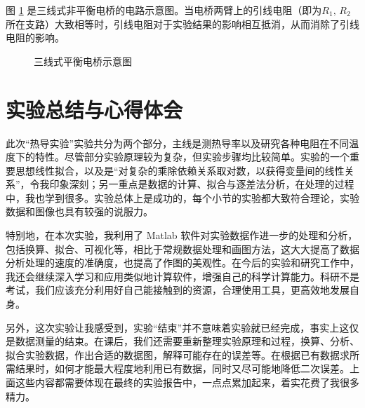 \documentclass[UTF8]{article}
\theoremstyle{MyLineTheoremStyle} %
\theoremstyle{MyBlockTheoremStyle} %
\theoremstyle{MySubsubsectionStyle} %
\begin{document}
图 \ref{三线式平衡电桥示意图} 是三线式非平衡电桥的电路示意图。当电桥两臂上的引线电阻（即为$ R_1,\,R_2 $所在支路）大致相等时，引线电阻对于实验结果的影响相互抵消，从而消除了引线电阻的影响。
\begin{figure}[H]
    \centering
    \caption{三线式平衡电桥示意图}
    \label{三线式平衡电桥示意图}
\end{figure}



\section{实验总结与心得体会}
此次“热导实验”实验共分为两个部分，主线是测热导率以及研究各种电阻在不同温度下的特性。尽管部分实验原理较为复杂，但实验步骤均比较简单。实验的一个重要思想线性拟合，以及是“对复杂的乘除依赖关系取对数，以获得变量间的线性关系”，令我印象深刻；另一重点是数据的计算、拟合与逐差法分析，在处理的过程中，我也学到很多。实验总体上是成功的，每个小节的实验都大致符合理论，实验数据和图像也具有较强的说服力。

特别地，在本次实验，我利用了 Matlab 软件对实验数据作进一步的处理和分析，包括换算、拟合、可视化等，相比于常规数据处理和画图方法，这大大提高了数据分析处理的速度的准确度，也提高了作图的美观性。在今后的实验和研究工作中，我还会继续深入学习和应用类似地计算软件，增强自己的科学计算能力。科研不是考试，我们应该充分利用好自己能接触到的资源，合理使用工具，更高效地发展自身。

另外，这次实验让我感受到，实验“结束”并不意味着实验就已经完成，事实上这仅是数据测量的结束。在课后，我们还需要重新整理实验原理和过程，换算、分析、拟合实验数据，作出合适的数据图，解释可能存在的误差等。在根据已有数据求所需结果时，如何才能最大程度地利用已有数据，同时又尽可能地降低二次误差。上面这些内容都需要体现在最终的实验报告中，一点点累加起来，着实花费了我很多精力。
\end{document}
